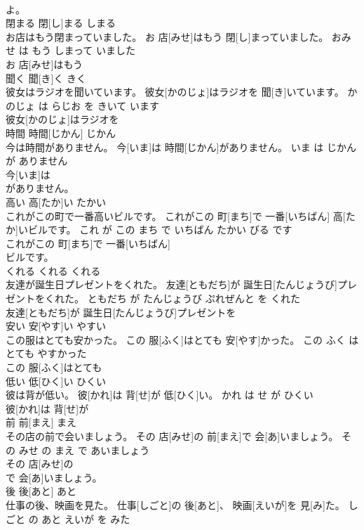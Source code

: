 \documentclass[8pt]{extreport}
\begin{document}
\begin{CJK}{UTF8}{min}
\\	よ。		
\\	閉まる	閉[し]まる	しまる	
\\	お店はもう閉まっていました。	お 店[みせ]はもう 閉[し]まっていました。	おみせ は もう しまって いました	
\\	お 店[みせ]はもう
\\	聞く	聞[き]く	きく	
\\	彼女はラジオを聞いています。	彼女[かのじょ]はラジオを 聞[き]いています。	かのじょ は らじお を きいて います	
\\	彼女[かのじょ]はラジオを
\\	時間	時間[じかん]	じかん	
\\	今は時間がありません。	今[いま]は 時間[じかん]がありません。	いま は じかん が ありません	
\\	今[いま]は
\\	がありません。		
\\	高い	高[たか]い	たかい	
\\	これがこの町で一番高いビルです。	これがこの 町[まち]で 一番[いちばん] 高[たか]いビルです。	これ が この まち で いちばん たかい びる です	
\\	これがこの 町[まち]で 一番[いちばん]
\\	ビルです。		
\\	くれる	くれる	くれる	
\\	友達が誕生日プレゼントをくれた。	友達[ともだち]が 誕生日[たんじょうび]プレゼントをくれた。	ともだち が たんじょうび ぷれぜんと を くれた	
\\	友達[ともだち]が 誕生日[たんじょうび]プレゼントを
\\	安い	安[やす]い	やすい	
\\	この服はとても安かった。	この 服[ふく]はとても 安[やす]かった。	この ふく は とても やすかった	
\\	この 服[ふく]はとても
\\	低い	低[ひく]い	ひくい	
\\	彼は背が低い。	彼[かれ]は 背[せ]が 低[ひく]い。	かれ は せ が ひくい	
\\	彼[かれ]は 背[せ]が
\\	前	前[まえ]	まえ	
\\	その店の前で会いましょう。	その 店[みせ]の 前[まえ]で 会[あ]いましょう。	その みせ の まえ で あいましょう	
\\	その 店[みせ]の
\\	で 会[あ]いましょう。		
\\	後	後[あと]	あと	
\\	仕事の後、映画を見た。	仕事[しごと]の 後[あと]、 映画[えいが]を 見[み]た。	しごと の あと えいが を みた	

\end{CJK}
\end{document}
